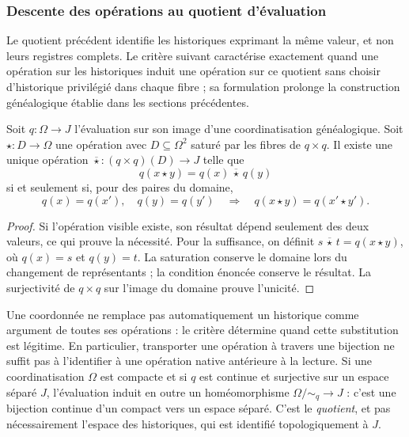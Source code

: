 \subsubsection{Descente des opérations au quotient d’évaluation}
\label{sec:ch-descenso-fibras}

Le quotient précédent identifie les historiques exprimant la même valeur, et non leurs registres complets. Le critère suivant caractérise exactement quand une opération sur les historiques induit une opération sur ce quotient sans choisir d'historique privilégié dans chaque fibre ; sa formulation prolonge la construction généalogique établie dans les sections précédentes.

\begin{proposition}
\label{prop:ch-descenso-fibras}
Soit \(q:\Omega\to J\) l'évaluation sur son image d'une coordinatisation généalogique. Soit \(\star:D\to\Omega\) une opération avec \(D\subseteq\Omega^2\) saturé par les fibres de \(q\times q\). Il existe une unique opération \(\overline\star:(q\times q)(D)\to J\) telle que
\[
 q(x\star y)=q(x)\,\overline\star\,q(y)
\]
si et seulement si, pour des paires du domaine,
\[
 q(x)=q(x'),\quad q(y)=q(y')
 \quad\Longrightarrow\quad q(x\star y)=q(x'\star y').
\]
\end{proposition}

\begin{proof}
Si l'opération visible existe, son résultat dépend seulement des deux valeurs, ce qui prouve la nécessité. Pour la suffisance, on définit \(s\,\overline\star\,t=q(x\star y)\), où \(q(x)=s\) et \(q(y)=t\). La saturation conserve le domaine lors du changement de représentants ; la condition énoncée conserve le résultat. La surjectivité de \(q\times q\) sur l'image du domaine prouve l'unicité.
\end{proof}

Une coordonnée ne remplace pas automatiquement un historique comme argument de toutes ses opérations : le critère détermine quand cette substitution est légitime. En particulier, transporter une opération à travers une bijection ne suffit pas à l'identifier à une opération native antérieure à la lecture. Si une coordinatisation \(\Omega\) est compacte et si \(q\) est continue et surjective sur un espace séparé \(J\), l'évaluation induit en outre un homéomorphisme \(\Omega/{\sim_q}\to J\) : c'est une bijection continue d'un compact vers un espace séparé. C'est le \emph{quotient}, et pas nécessairement l'espace des historiques, qui est identifié topologiquement à \(J\).
